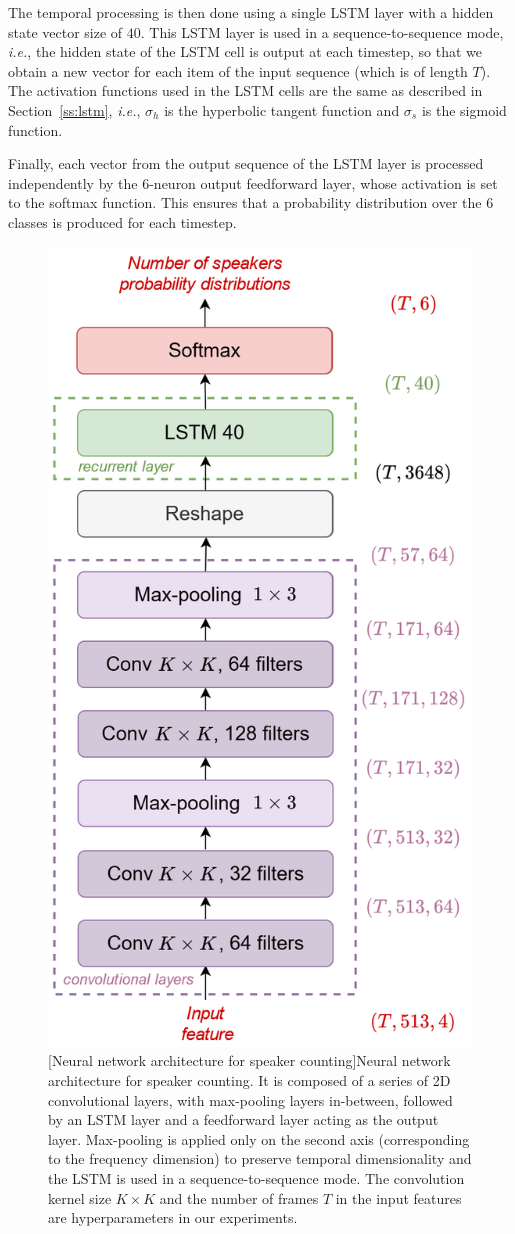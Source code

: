 The temporal processing is then done using a single LSTM layer with a hidden state vector size of $40$. This LSTM layer is used in a sequence-to-sequence mode, \emph{i.e.}, the hidden state of the LSTM cell is output at each timestep, so that we obtain a new vector for each item of the input sequence (which is of length $T$). The activation functions used in the LSTM cells are the same as described in Section~\ref{ss:lstm}, \emph{i.e.}, $\sigma_h$ is the hyperbolic tangent function and $\sigma_s$ is the sigmoid function.

Finally, each vector from the output sequence of the LSTM layer is processed independently by the 6-neuron output feedforward layer, whose activation is set to the softmax function. This ensures that a probability distribution over the $6$ classes is produced for each timestep.

\begin{figure}[t]
    \begin{center}
    \includegraphics[width=0.4\linewidth]{Images/chap5/countingNetworkArchitecture.png}
    [Neural network architecture for speaker counting]{Neural network architecture for speaker counting. It is composed of a series of 2D convolutional layers, with max-pooling layers in-between, followed by an LSTM layer and a feedforward layer acting as the output layer. Max-pooling is applied only on the second axis (corresponding to the frequency dimension) to preserve temporal dimensionality and the LSTM is used in a sequence-to-sequence mode. The convolution kernel size $K \times K$ and the number of frames $T$ in the input features are hyperparameters in our experiments.}
    \label{fig:countingNetworkArchitecture}
    \end{center}
\end{figure}

